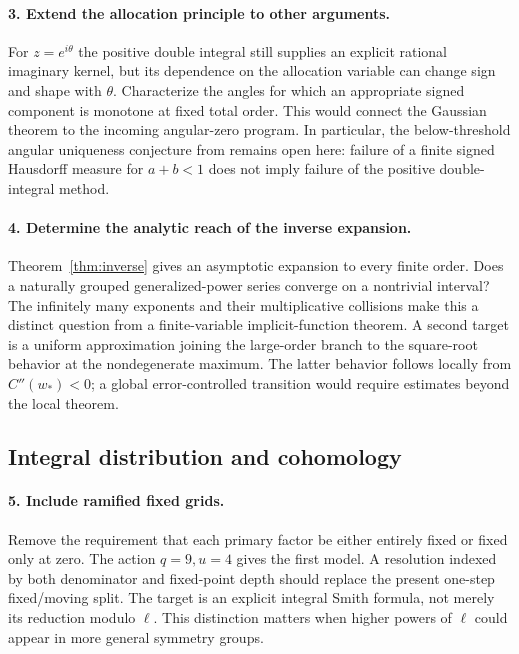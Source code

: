 \documentclass[11pt,a4paper]{article}
\numberwithin{equation}{section}
\theoremstyle{definition}
\theoremstyle{remark}
\begin{document}
\paragraph{3. Extend the allocation principle to other arguments.}
For $z=e^{i\theta}$ the positive double integral still supplies an
explicit rational imaginary kernel, but its dependence on the
allocation variable can change sign and shape with $\theta$.
Characterize the angles for which an appropriate signed component is
monotone at fixed total order. This would connect the Gaussian theorem
to the incoming angular-zero program. In particular, the
below-threshold angular uniqueness conjecture from \cite{realorder}
remains open here: failure of a finite signed Hausdorff measure for
$a+b<1$ does not imply failure of the positive double-integral method.

\paragraph{4. Determine the analytic reach of the inverse expansion.}
Theorem~\ref{thm:inverse} gives an asymptotic expansion to every finite
order. Does a naturally grouped generalized-power series converge on a
nontrivial interval? The infinitely many exponents and their
multiplicative collisions make this a distinct question from a
finite-variable implicit-function theorem. A second target is a
uniform approximation joining the large-order branch to the
square-root behavior at the nondegenerate maximum. The latter behavior
follows locally from $C''(w_*)<0$; a global error-controlled transition
would require estimates beyond the local theorem.

\subsection{Integral distribution and cohomology}

\paragraph{5. Include ramified fixed grids.}
Remove the requirement that each primary factor be either entirely
fixed or fixed only at zero. The action $q=9,u=4$ gives the first
model. A resolution indexed by both denominator and fixed-point depth
should replace the present one-step fixed/moving split. The target is
an explicit integral Smith formula, not merely its reduction modulo
$\ell$. This distinction matters when higher powers of $\ell$ could
appear in more general symmetry groups.
\end{document}
